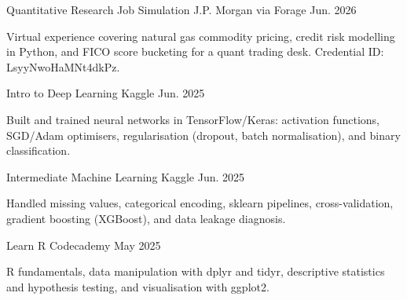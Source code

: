 

\begin{cventries}

  \cventry
    {Quantitative Research Job Simulation} %
    {J.P. Morgan via Forage} %
    {} %
    {Jun. 2026} %
    {
      \begin{cvitems}
        \item {Virtual experience covering natural gas commodity pricing, credit risk modelling in Python, and FICO score bucketing for a quant trading desk. Credential ID: LsyyNwoHaMNt4dkPz.}
      \end{cvitems}
    }

  \cventry
    {Intro to Deep Learning} %
    {Kaggle} %
    {} %
    {Jun. 2025} %
    {
      \begin{cvitems}
        \item {Built and trained neural networks in TensorFlow/Keras: activation functions, SGD/Adam optimisers, regularisation (dropout, batch normalisation), and binary classification.}
      \end{cvitems}
    }

  \cventry
    {Intermediate Machine Learning} %
    {Kaggle} %
    {} %
    {Jun. 2025} %
    {
      \begin{cvitems}
        \item {Handled missing values, categorical encoding, sklearn pipelines, cross-validation, gradient boosting (XGBoost), and data leakage diagnosis.}
      \end{cvitems}
    }

  \cventry
    {Learn R} %
    {Codecademy} %
    {} %
    {May 2025} %
    {
      \begin{cvitems}
        \item {R fundamentals, data manipulation with dplyr and tidyr, descriptive statistics and hypothesis testing, and visualisation with ggplot2.}
      \end{cvitems}
    }


\end{cventries}
